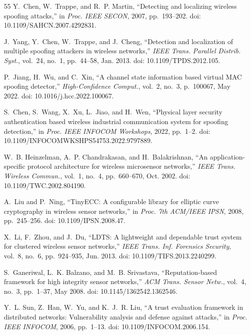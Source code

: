 \documentclass[conference]{IEEEtran}
\begin{document}
\begin{thebibliography}{55}
Y.~Chen, W.~Trappe, and R.~P. Martin, ``Detecting and localizing wireless spoofing attacks,'' in \textit{Proc. IEEE SECON}, 2007, pp.~193--202. doi: 10.1109/SAHCN.2007.4292831.

J.~Yang, Y.~Chen, W.~Trappe, and J.~Cheng, ``Detection and localization of multiple spoofing attackers in wireless networks,'' \textit{IEEE Trans. Parallel Distrib. Syst.}, vol.~24, no.~1, pp.~44--58, Jan. 2013. doi: 10.1109/TPDS.2012.105.

P.~Jiang, H.~Wu, and C.~Xin, ``A channel state information based virtual MAC spoofing detector,'' \textit{High-Confidence Comput.}, vol.~2, no.~3, p.~100067, May 2022. doi: 10.1016/j.hcc.2022.100067.

S.~Chen, S.~Wang, X.~Xu, L.~Jiao, and H.~Wen, ``Physical layer security authentication based wireless industrial communication system for spoofing detection,'' in \textit{Proc. IEEE INFOCOM Workshops}, 2022, pp.~1--2. doi: 10.1109/INFOCOMWKSHPS54753.2022.9797889.

W.~B. Heinzelman, A.~P. Chandrakasan, and H.~Balakrishnan, ``An application-specific protocol architecture for wireless microsensor networks,'' \textit{IEEE Trans. Wireless Commun.}, vol.~1, no.~4, pp.~660--670, Oct. 2002. doi: 10.1109/TWC.2002.804190.

A.~Liu and P.~Ning, ``TinyECC: A configurable library for elliptic curve cryptography in wireless sensor networks,'' in \textit{Proc. 7th ACM/IEEE IPSN}, 2008, pp.~245--256. doi: 10.1109/IPSN.2008.47.

X.~Li, F.~Zhou, and J.~Du, ``LDTS: A lightweight and dependable trust system for clustered wireless sensor networks,'' \textit{IEEE Trans. Inf. Forensics Security}, vol.~8, no.~6, pp.~924--935, Jun. 2013. doi: 10.1109/TIFS.2013.2240299.

S.~Ganeriwal, L.~K. Balzano, and M.~B. Srivastava, ``Reputation-based framework for high integrity sensor networks,'' \textit{ACM Trans. Sensor Netw.}, vol.~4, no.~3, pp.~1--37, May 2008. doi: 10.1145/1362542.1362546.

Y.~L. Sun, Z.~Han, W.~Yu, and K.~J.~R. Liu, ``A trust evaluation framework in distributed networks: Vulnerability analysis and defense against attacks,'' in \textit{Proc. IEEE INFOCOM}, 2006, pp.~1--13. doi: 10.1109/INFOCOM.2006.154.


\end{thebibliography}
\end{document}
